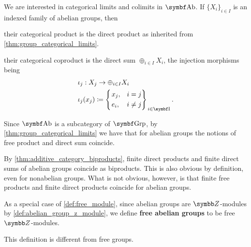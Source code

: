 \begin{proposition}\label{thm:abelian_group_categorical_limits}
  We are interested in categorical limits and colimits in \( \Bold{Ab} \). If \( \{ X_i \}_{i \in I} \) is an indexed family of abelian groups, then
  \begin{defenum}
     their categorical product is the direct product as inherited from \cref{thm:group_categorical_limits}.

     their categorical coproduct is the direct sum \( \oplus_{i \in I} X_i \), the injection morphisms being
    \begin{align*}
      &\iota_j: X_j \to \oplus_{i \in I} X_i \\
      &\iota_j(x_j) \coloneqq \begin{dcases}
        \begin{drcases}
          x_j, &i = j \\
          e_i, &i \neq j
        \end{drcases}
      \end{dcases}_{i \in \Bold I}.
    \end{align*}

    Since \( \Bold{Ab} \) is a subcategory of \( \Bold{Grp} \), by \cref{thm:group_categorical_limits} we have that for abelian groups the notions of free product and direct sum coincide.
  \end{defenum}
\end{proposition}

\begin{note}\label{note:abelian_group_biproducts}
  By \cref{thm:additive_category_biproducts}, finite direct products and finite direct sums of abelian groups coincide as biproducts. This is also obvious by definition, even for nonabelian groups. What is not obvious, however, is that finite free products and finite direct products coincide for abelian groups.
\end{note}

\begin{definition}\label{def:free_abelian_group}
  As a special case of \cref{def:free_module}, since abelian groups are \( \BB{Z} \)-modules by \cref{def:abelian_group_z_module}, we define \textbf{free abelian groups} to be free \( \BB{Z} \)-modules.

  This definition is different from free groups.
\end{definition}
